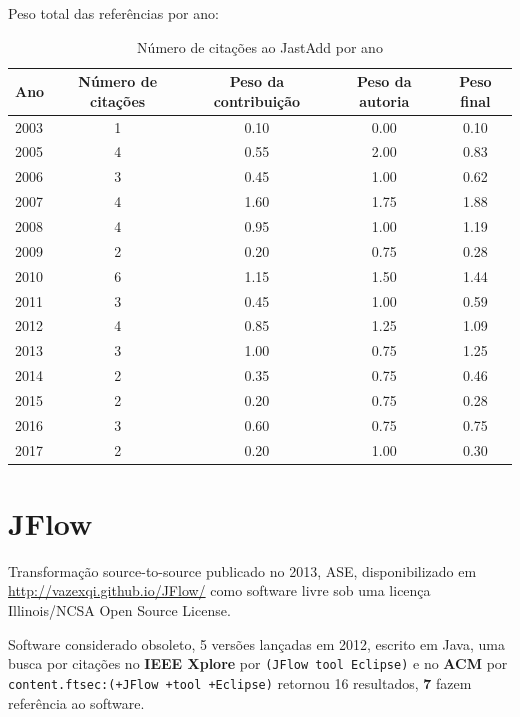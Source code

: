 Peso total das referências por ano:

\begin{table}[h]
\caption{Número de citações ao JastAdd por ano}
\centering
\begin{tabular}{| l | c | c | c | c |}
  \hline
  Ano & Número de citações & Peso da contribuição & Peso da autoria & Peso final \\
  \hline
  2003
    & 1
    & 0.10
    & 0.00
    & 0.10 \\
  2005
    & 4
    & 0.55
    & 2.00
    & 0.83 \\
  2006
    & 3
    & 0.45
    & 1.00
    & 0.62 \\
  2007
    & 4
    & 1.60
    & 1.75
    & 1.88 \\
  2008
    & 4
    & 0.95
    & 1.00
    & 1.19 \\
  2009
    & 2
    & 0.20
    & 0.75
    & 0.28 \\
  2010
    & 6
    & 1.15
    & 1.50
    & 1.44 \\
  2011
    & 3
    & 0.45
    & 1.00
    & 0.59 \\
  2012
    & 4
    & 0.85
    & 1.25
    & 1.09 \\
  2013
    & 3
    & 1.00
    & 0.75
    & 1.25 \\
  2014
    & 2
    & 0.35
    & 0.75
    & 0.46 \\
  2015
    & 2
    & 0.20
    & 0.75
    & 0.28 \\
  2016
    & 3
    & 0.60
    & 0.75
    & 0.75 \\
  2017
    & 2
    & 0.20
    & 1.00
    & 0.30 \\
  \hline
\end{tabular}
\end{table}


\section{JFlow}

Transformação source-to-source
publicado no 2013, ASE,
disponibilizado em \url{http://vazexqi.github.io/JFlow/}
como software livre
sob uma licença Illinois/NCSA Open Source License.

Software considerado obsoleto,
5 versões lançadas
em 2012,
escrito em Java,
uma busca por citações no {\bf IEEE Xplore} por
\texttt{(JFlow tool Eclipse)}
e no {\bf ACM} por
\texttt{content.ftsec:(+JFlow +tool +Eclipse)}
retornou
16 resultados,
{\bf 7} fazem referência ao software.

